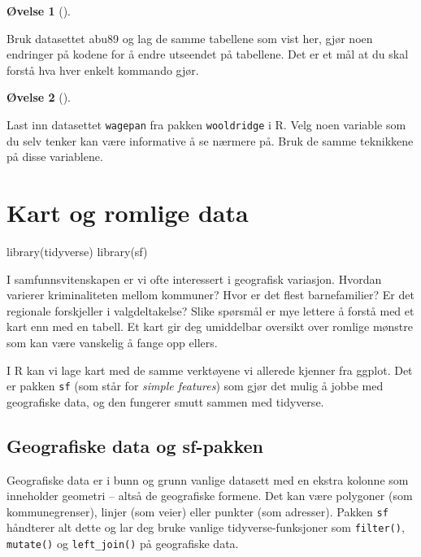 \documentclass[
  norsk,
  letterpaper,
  DIV=11,
  numbers=noendperiod]{scrreprt}
\newenvironment{Shaded}{\begin{snugshade}}{\end{snugshade}}
\newcommand{\FunctionTok}[1]{\textcolor[rgb]{0.28,0.35,0.67}{#1}}
\newcommand{\NormalTok}[1]{\textcolor[rgb]{0.00,0.23,0.31}{#1}}
\theoremstyle{definition}
\newtheorem{exercise}{Øvelse}[chapter]
\theoremstyle{remark}
\begin{document}
\begin{exercise}[]\protect\hypertarget{exr-}{}\label{exr-}

Bruk datasettet abu89 og lag de samme tabellene som vist her, gjør noen
endringer på kodene for å endre utseendet på tabellene. Det er et mål at
du skal forstå hva hver enkelt kommando gjør.

\end{exercise}

\begin{exercise}[]\protect\hypertarget{exr-}{}\label{exr-}

Last inn datasettet \texttt{wagepan} fra pakken \texttt{wooldridge} i R.
Velg noen variable som du selv tenker kan være informative å se nærmere
på. Bruk de samme teknikkene på disse variablene.

\end{exercise}

\chapter{Kart og romlige data}\label{kart-og-romlige-data}

\begin{Shaded}
\begin{Highlighting}[]
\FunctionTok{library}\NormalTok{(tidyverse)}
\FunctionTok{library}\NormalTok{(sf)}
\end{Highlighting}
\end{Shaded}

I samfunnsvitenskapen er vi ofte interessert i geografisk variasjon.
Hvordan varierer kriminaliteten mellom kommuner? Hvor er det flest
barnefamilier? Er det regionale forskjeller i valgdeltakelse? Slike
spørsmål er mye lettere å forstå med et kart enn med en tabell. Et kart
gir deg umiddelbar oversikt over romlige mønstre som kan være vanskelig
å fange opp ellers.

I R kan vi lage kart med de samme verktøyene vi allerede kjenner fra
ggplot. Det er pakken \texttt{sf} (som står for \emph{simple features})
som gjør det mulig å jobbe med geografiske data, og den fungerer smutt
sammen med tidyverse.

\section{Geografiske data og
sf-pakken}\label{geografiske-data-og-sf-pakken}

Geografiske data er i bunn og grunn vanlige datasett med en ekstra
kolonne som inneholder geometri -- altså de geografiske formene. Det kan
være polygoner (som kommunegrenser), linjer (som veier) eller punkter
(som adresser). Pakken \texttt{sf} håndterer alt dette og lar deg bruke
vanlige tidyverse-funksjoner som \texttt{filter()}, \texttt{mutate()} og
\texttt{left\_join()} på geografiske data.
\end{document}
